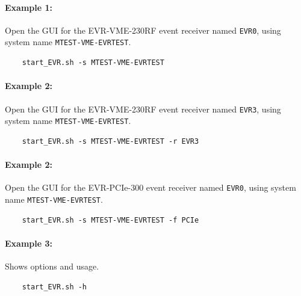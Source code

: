 \documentclass[12pt,a4paper]{article}
\begin{document}
\paragraph{Example 1:} Open the GUI for the EVR-VME-230RF event receiver named \texttt{EVR0}, using system name \texttt{MTEST-VME-EVRTEST}.
\begin{verbatim}
	start_EVR.sh -s MTEST-VME-EVRTEST
\end{verbatim}

\paragraph{Example 2:} Open the GUI for the EVR-VME-230RF event receiver named \texttt{EVR3}, using system name \texttt{MTEST-VME-EVRTEST}.
\begin{verbatim}
	start_EVR.sh -s MTEST-VME-EVRTEST -r EVR3
\end{verbatim}

\paragraph{Example 2:} Open the GUI for the EVR-PCIe-300 event receiver named \texttt{EVR0}, using system name \texttt{MTEST-VME-EVRTEST}.
\begin{verbatim}
	start_EVR.sh -s MTEST-VME-EVRTEST -f PCIe
\end{verbatim}

\paragraph{Example 3:} Shows options and usage.
\begin{verbatim}
	start_EVR.sh -h
\end{verbatim}



\end{document}

